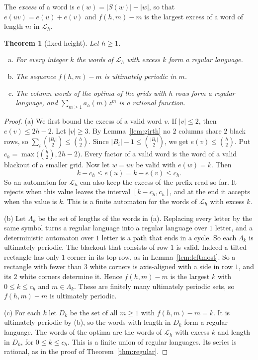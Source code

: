 \documentclass[12pt]{article}
\theoremstyle{plain}
\newtheorem{theorem}{Theorem}
\theoremstyle{definition}
\theoremstyle{remark}
\begin{document}
The \emph{excess} of a word is $e(w)=|S(w)|-|w|$, so that $e(uv)=e(u)+e(v)$ and
$f(h,m)-m$ is the largest excess of a word of length $m$ in $\mathcal L_h$.

\begin{theorem}[fixed height]\label{thm:rational}
Let $h\ge1$.
\begin{enumerate}[(a)]
\item For every integer $k$ the words of $\mathcal L_h$ with excess $k$ form a
regular language.
\item The sequence $f(h,m)-m$ is ultimately periodic in $m$.
\item The column words of the optima of the grids with $h$ rows form a regular
language, and $\sum_{m\ge1}a_h(m)z^m$ is a rational function.
\end{enumerate}
\end{theorem}

\begin{proof}
(a) We first bound the excess of a valid word $v$. If $|v|\le2$, then
$e(v)\le2h-2$. Let $|v|\ge3$. By Lemma~\ref{lem:girth} no $2$ columns share $2$
black rows, so $\sum_i\binom{|B_i|}2\le\binom h2$. Since
$|B_i|-1\le\binom{|B_i|}2$, we get $e(v)\le\binom h2$. Put
$c_h=\max\bigl(\binom h2,2h-2\bigr)$. Every factor of a valid word is the word
of a valid blackout of a smaller grid. Now let $w=uv$ be valid with $e(w)=k$.
Then
\[
k-c_h\le e(u)=k-e(v)\le c_h .
\]
So an automaton for $\mathcal L_h$ can also keep the excess of the prefix read
so far. It rejects when this value leaves the interval $[k-c_h,c_h]$, and at
the end it accepts when the value is $k$. This is a finite automaton for the
words of $\mathcal L_h$ with excess $k$.

(b) Let $\Lambda_k$ be the set of lengths of the words in (a). Replacing every
letter by the same symbol turns a regular language into a regular language
over $1$ letter, and a deterministic automaton over $1$ letter is a path that
ends in a cycle. So each $\Lambda_k$ is ultimately periodic. The blackout that
consists of row $1$ is valid. Indeed a tilted rectangle has only $1$ corner in
its top row, as in Lemma~\ref{lem:leftmost}. So a rectangle with fewer than $3$
white corners is axis-aligned with a side in row $1$, and its $2$ white corners
determine it. Hence $f(h,m)-m$ is the largest $k$ with $0\le k\le c_h$ and
$m\in\Lambda_k$. These are finitely many ultimately periodic sets, so
$f(h,m)-m$ is ultimately periodic.

(c) For each $k$ let $D_k$ be the set of all $m\ge1$ with $f(h,m)-m=k$. It is
ultimately periodic by (b), so the words with length in $D_k$ form a regular
language. The words of the optima are the words of $\mathcal L_h$ with excess
$k$ and length in $D_k$, for $0\le k\le c_h$. This is a finite union of regular
languages. Its series is rational, as in the proof of
Theorem~\ref{thm:regular}.
\end{proof}
\end{document}
